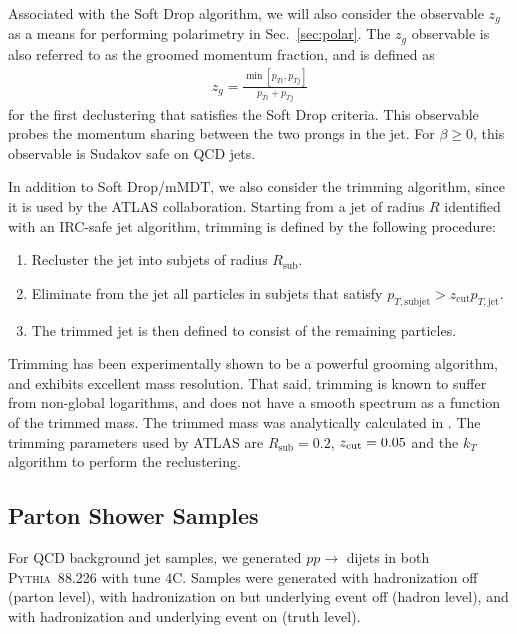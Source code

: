 \documentclass[11pt,letterpaper]{article}
\newcommand{\pythia}{\textsc{Pythia~8}\xspace}
\DeclareRobustCommand{\Sec}[1]{Sec.~\ref{#1}}
\newcommand{\zcut}{z_{\rm cut}}
\begin{document}
Associated with the Soft Drop algorithm, we will also consider the observable $z_g$ as a means for performing polarimetry in \Sec{sec:polar}.
%
The $z_g$ observable is also referred to as the groomed momentum fraction, and is defined as
%
\begin{align}
z_g=\frac{\min\left[ p_{Ti}, p_{Tj}  \right]}{p_{Ti}+p_{Tj}}
\end{align}
%
for the first declustering that satisfies the Soft Drop criteria.
%
This observable probes the momentum sharing between the two prongs in the
jet. For $\beta \ge 0$, this observable is Sudakov safe \cite{Larkoski:2013paa} on QCD
jets.

In addition to Soft Drop/mMDT, we also consider the trimming algorithm, since it is used by the ATLAS collaboration.
%
Starting from a jet of radius $R$ identified with an IRC-safe jet algorithm, trimming is defined by the following procedure:
%
\begin{enumerate}
%
\item Recluster the jet into subjets of radius $R_{\text{sub}}$.
%
\item Eliminate from the jet all particles in subjets that satisfy
  $p_{T,\text{subjet}} > z_{\text{cut}}p_{T,\text{jet}}$.
%
\item The trimmed jet is then defined to consist of the remaining particles.
%
\end{enumerate}
%
Trimming has been experimentally shown to be a powerful grooming algorithm, and exhibits excellent mass resolution.
%
That said, trimming is known to suffer from non-global logarithms, and does not have a smooth spectrum as a function of the trimmed mass.
%
The trimmed mass was analytically calculated in \cite{Dasgupta:2013ihk}.
%
The trimming parameters used by ATLAS are $R_{\text{sub}}=0.2$,  $ \zcut=0.05$ and the $k_T$ algorithm to perform the reclustering.


\subsection{Parton Shower Samples}\label{sec:samples_sub}



For QCD background jet samples, we generated $pp\to$ dijets in both \pythia{8.226} \cite{Sjostrand:2006za,Sjostrand:2007gs} with tune $4$C. 
%
Samples were generated with hadronization off (parton level), with hadronization on but underlying event off (hadron level), and with hadronization and underlying event on (truth level).
\end{document}
